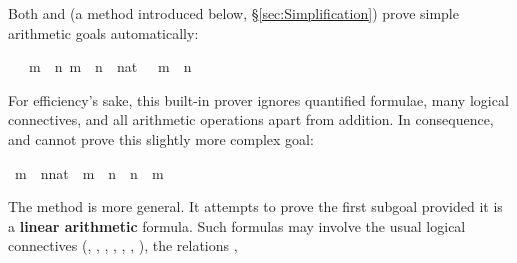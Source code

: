 \begin{isabellebody}
\begin{isamarkuptext}
Both  and 
(a method introduced below, \S\ref{sec:Simplification}) prove 
simple arithmetic goals automatically:%
\end{isamarkuptext}%
\isamarkuptrue%
\isamarkupfalse%
\ {}{}\ {}\ m\ {}\ n{}\ m\ {}\ n\ {}\ {}{}{}{}nat{}\ {}\ {}\ m\ {}\ n{}%
\isadelimproof
%
\endisadelimproof
%
\isatagproof
%
\endisatagproof
{\isafoldproof}%
%
\isadelimproof
%
\endisadelimproof
%
\begin{isamarkuptext}%
\noindent
For efficiency's sake, this built-in prover ignores quantified formulae,
many logical connectives, and all arithmetic operations apart from addition.
In consequence,  and  cannot prove this slightly more complex goal:%
\end{isamarkuptext}%
\isamarkuptrue%
\isamarkupfalse%
\ {}m\ {}\ {}n{}{}nat{}\ {}\ m\ {}\ n\ {}\ n\ {}\ m{}%
\isadelimproof
%
\endisadelimproof
%
\isatagproof
%
\endisatagproof
{\isafoldproof}%
%
\isadelimproof
%
\endisadelimproof
%
\begin{isamarkuptext}%
\noindent The method  is more general.  It attempts to
prove the first subgoal provided it is a \textbf{linear arithmetic} formula.
Such formulas may involve the usual logical connectives (,
, , , ,
, ), the relations ,

\end{isamarkuptext}
\end{isabellebody}
